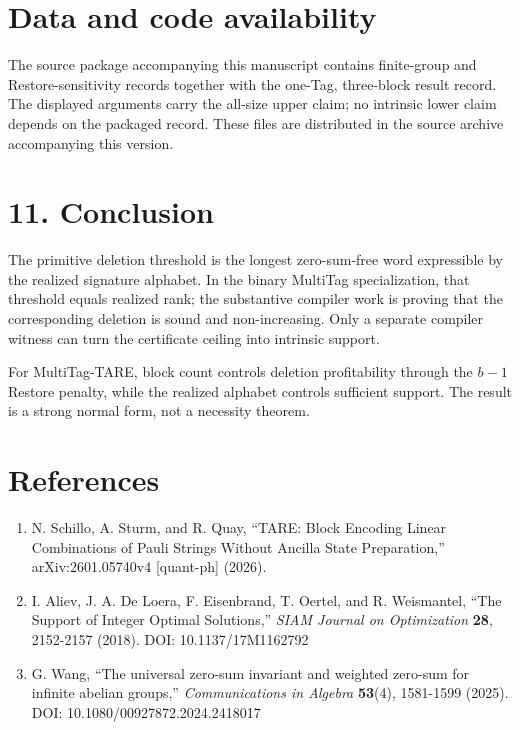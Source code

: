 \documentclass[
  11pt,
]{article}
\providecommand{\tightlist}{%
  \setlength{\itemsep}{0pt}\setlength{\parskip}{0pt}}
\begin{document}
\hypertarget{data-and-code-availability}{%
\section{Data and code availability}\label{data-and-code-availability}}

The source package accompanying this manuscript contains finite-group
and Restore-sensitivity records together with the one-Tag, three-block
result record. The displayed arguments carry the all-size upper claim;
no intrinsic lower claim depends on the packaged record. These files are
distributed in the source archive accompanying this version.

\hypertarget{conclusion}{%
\section{11. Conclusion}\label{conclusion}}

The primitive deletion threshold is the longest zero-sum-free word
expressible by the realized signature alphabet. In the binary MultiTag
specialization, that threshold equals realized rank; the substantive
compiler work is proving that the corresponding deletion is sound and
non-increasing. Only a separate compiler witness can turn the
certificate ceiling into intrinsic support.

For MultiTag-TARE, block count controls deletion profitability through
the \(b-1\) Restore penalty, while the realized alphabet controls
sufficient support. The result is a strong normal form, not a necessity
theorem.

\enlargethispage{8\baselineskip}
\hypertarget{references}{%
\section{References}\label{references}}

\begin{enumerate}
\def\labelenumi{\arabic{enumi}.}
\tightlist
\item
  N. Schillo, A. Sturm, and R. Quay, ``TARE: Block Encoding Linear
  Combinations of Pauli Strings Without Ancilla State Preparation,''
  arXiv:2601.05740v4 {[}quant-ph{]} (2026).
\item
  I. Aliev, J. A. De Loera, F. Eisenbrand, T. Oertel, and R. Weismantel,
  ``The Support of Integer Optimal Solutions,'' \emph{SIAM Journal on
  Optimization} \textbf{28}, 2152-2157 (2018). DOI: 10.1137/17M1162792
\item
  G. Wang, ``The universal zero-sum invariant and weighted zero-sum for
  infinite abelian groups,'' \emph{Communications in Algebra}
  \textbf{53}(4), 1581-1599 (2025). DOI: 10.1080/00927872.2024.2418017
\end{enumerate}
\end{document}
